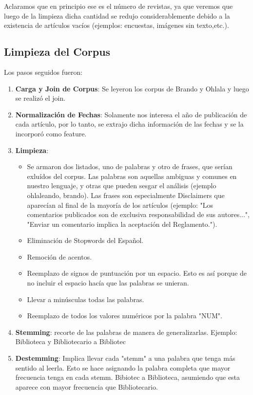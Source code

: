 \documentclass[a4paper]{article}
\begin{document}
Aclaramos que en principio ese es el n\'umero de revistas, ya que veremos que luego de la limpieza dicha cantidad se redujo considerablemente debido a la existencia de art\'iculos vac\'ios (ejemplos: encuestas, im\'agenes sin texto,etc.).

\subsection{Limpieza del Corpus}

Los pasos seguidos fueron:
\begin{enumerate}
\item \textbf{Carga y Join de Corpus}: Se leyeron los corpus de Brando y Ohlala y luego se realiz\'o el join.
\item \textbf{Normalizaci\'on de Fechas}: Solamente nos interesa el a\~no de publicaci\'on de cada art\'iculo, por lo tanto, se extrajo dicha informaci\'on de las fechas y se la incorpor\'o como feature.
\item \textbf{Limpieza}:
	\begin{itemize}
	\item Se armaron dos listados, uno de palabras y otro de frases, que ser\'ian exlu\'idos del corpus. Las palabras son aquellas ambiguas y comunes en nuestro lenguaje, y otras que pueden sesgar el an\'alisis (ejemplo ohlaleando, brando). Las frases son especialmente Disclaimers que aparec\'ian al final de la mayor\'ia de los art\'iculos (ejemplo: "Los comentarios publicados son de exclusiva responsabilidad de sus autores...", "Enviar un comentario implica la aceptación del Reglamento.").
    \item Eliminaci\'on de Stopwords del Espa\~nol.
    \item Remoci\'on de acentos. 
    \item Reemplazo de signos de puntuaci\'on por un espacio. Esto es as\'i porque de no incluir el espacio hac\'ia que las palabras se unieran.
    \item Llevar a min\'usculas todas las palabras.
    \item Reemplazo de todos los valores num\'ericos por la palabra "NUM".
	\end{itemize}
\item \textbf{Stemming}: recorte de las palabras de manera de generalizarlas. Ejemplo: Biblioteca y Bibliotecario a Bibliotec
\item \textbf{Destemming}: Implica llevar cada "stemm" a una palabra que tenga m\'as sentido al leerla. Esto se hace asignando la palabra completa que mayor frecuencia tenga en cada stemm. Bibiotec a Biblioteca, asumiendo que esta aparece con mayor frecuencia que Bibliotecario. 

\end{enumerate}
\end{document}
